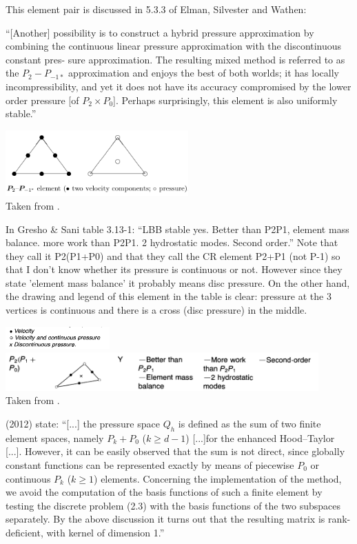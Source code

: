 

This element pair is discussed in 5.3.3 of Elman, Silvester and Wathen: 

``[Another] possibility is to construct a hybrid pressure approximation by 
combining the continuous linear pressure approximation with the discontinuous constant pres-
sure approximation. The resulting mixed method is referred to as the $P_2-P_{-1*}$ 
approximation and enjoys the best of both worlds; it has locally 
incompressibility, and yet it does not have its accuracy compromised by
the lower order pressure [of $P_2\times P_0$]. 
Perhaps surprisingly, this element is also uniformly stable.'' 

\begin{center}
\includegraphics[width=7cm]{images/pair_p2p1p0/elsw}\\
{\captionfont Taken from \textcite{elsw}.}
\end{center}

In Gresho \& Sani table 3.13-1: ``LBB stable yes. Better than P2P1, element mass balance.
more work than P2P1. 2 hydrostatic modes. Second order.'' 
Note that they call it P2(P1+P0) and that they call the CR element P2+P1 (not P-1) so that 
I don't know whether its pressure is continuous or not. However since they state 'element mass balance'
it probably means disc pressure. On the other hand, the drawing and legend of this element in the table 
is clear: pressure at the 3 vertices is continuous and there is a cross (disc pressure) in the middle. 

\begin{center}
\includegraphics[width=4cm]{images/pair_p2p1p0/grsa2}
\includegraphics[width=12cm]{images/pair_p2p1p0/grsa1}\\
{\captionfont Taken from \textcite{grsa}.}
\end{center}

\textcite{bocg12} (2012) state: ``[...] the pressure space $Q_h$ is defined as the sum of two finite 
element spaces, namely $P_k+P_0$ ($k \ge d- 1$) [...]for the enhanced Hood–Taylor [...]. 
However, it can be easily observed that the sum is not direct, 
since globally constant functions can be represented exactly by means of piecewise 
$P_0$ or continuous $P_k$ ($k \ge 1$) elements.
Concerning the implementation of the method, we avoid the computation of the basis
functions of such a finite element by testing the discrete problem (2.3) with the basis 
functions of the two subspaces separately. By the above discussion it turns out that the resulting
matrix is rank-deficient, with kernel of dimension 1.''


